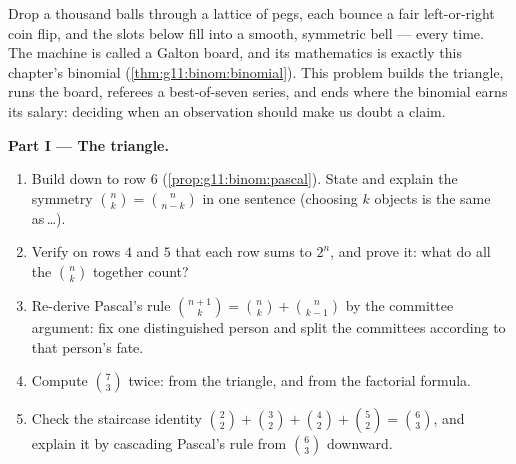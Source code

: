 \begin{problem}
\label{pb:g11:binom:1}
Drop a thousand balls through a lattice of pegs, each bounce a
fair left-or-right coin flip, and the slots below fill into a
smooth, symmetric bell --- every time. The machine is called a
Galton board, and its mathematics is exactly this chapter's
binomial  (\cref{thm:g11:binom:binomial}). This
problem builds the triangle, runs the board, referees a
best-of-seven series, and ends where the binomial earns its
salary: deciding when an observation should make us doubt a
claim.

\medskip
\noindent\textbf{Part I --- The triangle.}
\begin{enumerate}
  \item Build  down to row $6$
        (\cref{prop:g11:binom:pascal}). State and explain the
        symmetry $\binom nk = \binom{n}{n-k}$ in one sentence
        (choosing $k$ objects is the same as\,\dots).
  \item Verify on rows $4$ and $5$ that each row sums to $2^n$,
        and prove it: what do all the $\binom nk$ together
        count?
  \item Re-derive Pascal's rule
        $\binom{n+1}{k} = \binom nk + \binom{n}{k-1}$ by the
        committee argument: fix one distinguished person and
        split the committees according to that person's fate.
  \item Compute $\binom73$ twice: from the triangle, and from
        the factorial formula.
  \item Check the staircase identity
        $\binom22 + \binom32 + \binom42 + \binom52 =
        \binom63$, and explain it by cascading Pascal's rule
        from $\binom63$ downward.
\end{enumerate}


\end{problem}
